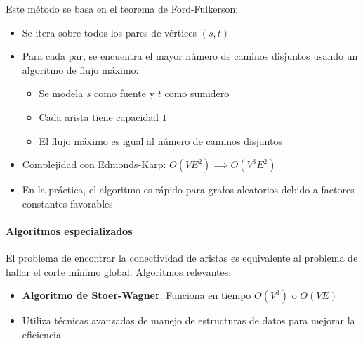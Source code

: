 \documentclass[a4paper]{article}
\begin{document}
Este método se basa en el teorema de Ford-Fulkerson:
\begin{itemize}
    \item Se itera sobre todos los pares de vértices \((s, t)\)
    \item Para cada par, se encuentra el mayor número de caminos disjuntos usando un algoritmo de flujo máximo:
    \begin{itemize}
        \item Se modela \(s\) como fuente y \(t\) como sumidero
        \item Cada arista tiene capacidad \(1\)
        \item El flujo máximo es igual al número de caminos disjuntos
    \end{itemize}
    \item Complejidad con Edmonds-Karp: \(O(V E^2) \implies O(V^3 E^2)\)
    \item En la práctica, el algoritmo es rápido para grafos aleatorios debido a factores constantes favorables
\end{itemize}

\paragraph{Algoritmos especializados}
El problema de encontrar la conectividad de aristas es equivalente al problema de hallar el corte mínimo global. Algoritmos relevantes:
\begin{itemize}
    \item \textbf{Algoritmo de Stoer-Wagner}: Funciona en tiempo \(O(V^3)\) o \(O(V E)\)
    \item Utiliza técnicas avanzadas de manejo de estructuras de datos para mejorar la eficiencia
\end{itemize}
\end{document}
